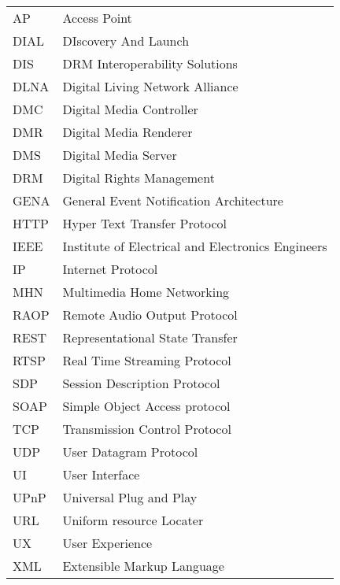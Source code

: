 



\begin{tabular}{ll}
AP	   & Access Point \\
DIAL	   & DIscovery And Launch \label{dial_shortfor} \\
DIS		& DRM Interoperability Solutions\\
DLNA       & Digital Living Network Alliance\label{dlna_shortfor} \\ 
DMC        & Digital Media Controller \\
DMR        & Digital Media Renderer \\
DMS        & Digital Media Server \\
DRM        & Digital Rights Management \\ 
GENA		& General Event Notification Architecture\\
HTTP       & Hyper Text Transfer Protocol \\
IEEE		& Institute of Electrical and Electronics Engineers \\
IP		& Internet Protocol \\
MHN		 & Multimedia Home Networking \\
RAOP	   & Remote Audio Output Protocol\\
REST		& Representational State Transfer\\
RTSP       & Real Time Streaming Protocol \\
SDP    	& Session Description Protocol\\ 
SOAP		& Simple Object Access protocol\\
TCP		& Transmission Control Protocol \\
UDP		& User Datagram Protocol \\
UI		& User Interface \\
UPnP	   & Universal Plug and Play \label{upnp_shortfor} \\
URL		& Uniform resource Locater \\
UX		& User Experience \\
XML		& Extensible Markup Language \\

\end{tabular}
